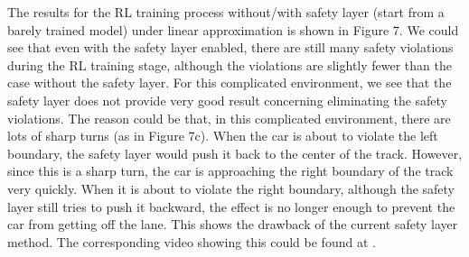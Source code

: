 \documentclass{article} %
\begin{document}
The results for the RL training process without/with safety layer (start from a barely trained model) under linear approximation is shown in Figure 7. We could see that even with the safety layer enabled, there are still many safety violations during the RL training stage, although the violations are slightly fewer than the case without the safety layer. For this complicated environment, we see that the safety layer does not provide very good result concerning eliminating the safety violations. The reason could be that, in this complicated environment, there are lots of sharp turns (as in Figure 7c). When the car is about to violate the left boundary, the safety layer would push it back to the center of the track. However, since this is a sharp turn, the car is approaching the right boundary of the track very quickly. When it is about to violate the right boundary, although the safety layer still tries to push it backward, the effect is no longer enough to prevent the car from getting off the lane. This shows the drawback of the current safety layer method. The corresponding video showing this could be found at \cite{safe-RL-video3}.
\end{document}
